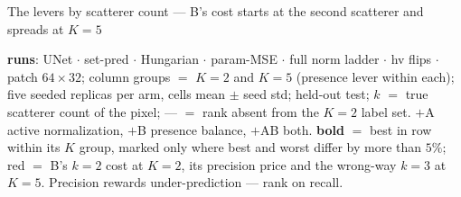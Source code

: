 \begin{frame}{The levers by scatterer count --- B's cost starts at the second scatterer and spreads at $K{=}5$}
  \parbox{0.94\textwidth}{\tiny\color{soft} \textbf{runs}: UNet $\cdot$ set-pred $\cdot$ Hungarian $\cdot$ param-MSE $\cdot$ full norm ladder $\cdot$ hv flips $\cdot$ patch $64{\times}32$; column groups $=$ $K{=}2$ and $K{=}5$ (presence lever within each); five seeded replicas per arm, cells mean $\pm$ seed std; held-out test; $k$ $=$ true scatterer count of the pixel; --- $=$ rank absent from the $K{=}2$ label set. $+$A active normalization, $+$B presence balance, $+$AB both. \textbf{bold} $=$ best in row within its $K$ group, marked only where best and worst differ by more than $5\%$; \textcolor{accent}{red} $=$ B's $k{=}2$ cost at $K{=}2$, its precision price and the wrong-way $k{=}3$ at $K{=}5$. Precision rewards under-prediction --- rank on recall.\par}
\end{frame}

